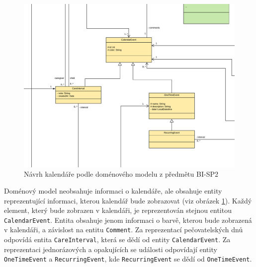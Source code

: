         \begin{figure}\centering
	        \includegraphics[width=1.0\textwidth]{pdfs/CalendarInfo1}
	        \caption[Současný návrh kalendáře]{Návrh kalendáře podle doménového modelu z předmětu BI-SP2}\label{image:calendar-info}
        \end{figure}
        Doménový model neobsahuje informaci o kalendáře, ale obsahuje entity reprezentující informaci, kterou kalendář bude zobrazovat (viz obrázek \ref{image:calendar-info}). Každý element, který bude zobrazen v kalendáři, je reprezentován stejnou entitou \texttt{CalendarEvent}. Entita obsahuje jenom informaci o barvě, kterou bude zobrazená v kalendáři, a závislost na entitu \texttt{Comment}. Za reprezentací pečovatelských dnů odpovídá entita \texttt{CareInterval}, která se dědí od entity \texttt{CalendarEvent}. Za reprezentaci jednorázových a opakujících se události odpovídají entity \texttt{OneTimeEvent} a \texttt{RecurringEvent}, kde \texttt{RecurringEvent} se dědí od \texttt{OneTimeEvent}.
        
        
